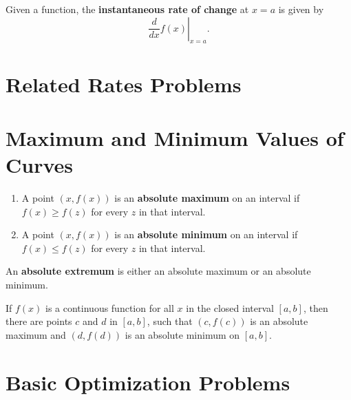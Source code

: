 \documentclass{ximera}
\newcommand{\ddx}{\frac{d}{dx}}
\begin{document}
\begin{definition}
Given a function, the \textbf{instantaneous rate of change} at $x=a$ is given by
\[
\left.\ddx f(x) \right|_{x=a}.
\]
\end{definition}





\section{Related Rates Problems}








\section{Maximum and Minimum Values of Curves}







\begin{definition}\hfil{}
\begin{enumerate}
\item A point $(x,f(x))$ is an \textbf{absolute maximum} on an interval
if $f(x)\ge f(z)$ for every $z$ in that interval.
\item A point $(x,f(x))$ is an \textbf{absolute minimum} on an interval if
$f(x)\le f(z)$ for every $z$ in that interval.
\end{enumerate}
An \textbf{absolute extremum} is either an
absolute maximum or an absolute minimum.
\end{definition}



\begin{theorem}\label{theorem:evt}
If $f(x)$ is a continuous function for all $x$ in the closed interval
$[a,b]$, then there are points $c$ and $d$ in $[a,b]$, such that
$(c,f(c))$ is an absolute maximum and $(d,f(d))$ is an absolute
minimum on $[a, b]$.
\end{theorem}






\section{Basic Optimization Problems}
\end{document}
